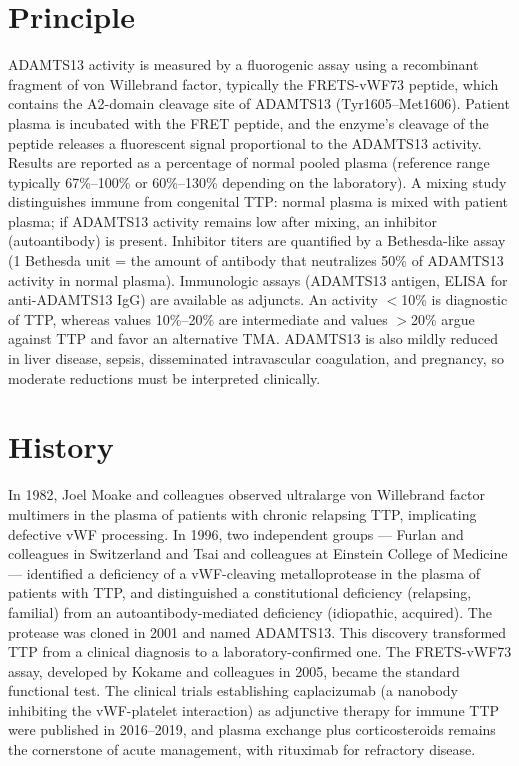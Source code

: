 \section*{Principle}
ADAMTS13 activity is measured by a fluorogenic assay using a recombinant fragment of von Willebrand factor, typically the FRETS-vWF73 peptide, which contains the A2-domain cleavage site of ADAMTS13 (Tyr1605--Met1606). Patient plasma is incubated with the FRET peptide, and the enzyme's cleavage of the peptide releases a fluorescent signal proportional to the ADAMTS13 activity. Results are reported as a percentage of normal pooled plasma (reference range typically 67\%--100\% or 60\%--130\% depending on the laboratory). A mixing study distinguishes immune from congenital TTP: normal plasma is mixed with patient plasma; if ADAMTS13 activity remains low after mixing, an inhibitor (autoantibody) is present. Inhibitor titers are quantified by a Bethesda-like assay (1 Bethesda unit = the amount of antibody that neutralizes 50\% of ADAMTS13 activity in normal plasma). Immunologic assays (ADAMTS13 antigen, ELISA for anti-ADAMTS13 IgG) are available as adjuncts. An activity $<$10\% is diagnostic of TTP, whereas values 10\%--20\% are intermediate and values $>$20\% argue against TTP and favor an alternative TMA. ADAMTS13 is also mildly reduced in liver disease, sepsis, disseminated intravascular coagulation, and pregnancy, so moderate reductions must be interpreted clinically.

\section*{History}
In 1982, Joel Moake and colleagues observed ultralarge von Willebrand factor multimers in the plasma of patients with chronic relapsing TTP, implicating defective vWF processing. In 1996, two independent groups --- Furlan and colleagues in Switzerland and Tsai and colleagues at Einstein College of Medicine --- identified a deficiency of a vWF-cleaving metalloprotease in the plasma of patients with TTP, and distinguished a constitutional deficiency (relapsing, familial) from an autoantibody-mediated deficiency (idiopathic, acquired). The protease was cloned in 2001 and named ADAMTS13. This discovery transformed TTP from a clinical diagnosis to a laboratory-confirmed one. The FRETS-vWF73 assay, developed by Kokame and colleagues in 2005, became the standard functional test. The clinical trials establishing caplacizumab (a nanobody inhibiting the vWF-platelet interaction) as adjunctive therapy for immune TTP were published in 2016--2019, and plasma exchange plus corticosteroids remains the cornerstone of acute management, with rituximab for refractory disease.

